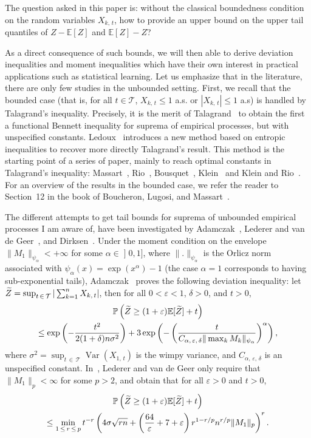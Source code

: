 \documentclass[10pt]{amsart}
\theoremstyle{definition}\newtheorem{defi}[theo]{Definition}\newtheorem{rema}[theo]{Remark}\newtheorem{exam}[theo]{Example}\newtheorem{exem}[theo]{Example}\newtheorem{nota}[theo]{Notation}
\DeclareMathOperator{\Var}{Var}
\newcommand{\bE}{\mathbb{E}}
\newcommand{\bP}{\mathbb{P}}
\newcommand{\cT}{\mathcal{T}}
\newcommand{\intervalleof}[2]{\mathopen{]} #1\mathclose{}\mathpunct{},#2\mathclose{]}}
\let\oldtilde\tilde
\renewcommand*{\tilde}[1]{\mathchoice{\widetilde{#1}}{\widetilde{#1}}{\oldtilde{#1}}{\oldtilde{#1}}}
\begin{document}
The question asked in this paper is: without the classical boundedness condition on the random variables $X_{k,\,t}$, how to provide an upper bound on the upper tail quantiles of $Z-\bE[Z]$ and $\bE[Z]-Z$?

As a direct consequence of such bounds, we will then able to derive deviation inequalities and moment inequalities which have their own interest in practical applications such as statistical learning. Let us emphasize that in the literature, there are only few studies in the unbounded setting. First, we recall that the bounded case (that is, for all $t\in\cT$, $X_{k,\,t}\leq 1$ a.s. or $|X_{k,\,t}|\leq 1$ a.s) is handled by Talagrand's inequality. Precisely, it is the merit of Talagrand~\cite{Talagrand96a} to obtain the first a functional Bennett inequality for suprema of empirical processes, but with unspecified constants. Ledoux~\cite{Ledoux97} introduces a new method based on entropic inequalities to recover more directly Talagrand’s result. This method is the starting point of a series of paper, mainly to reach optimal constants in Talagrand's inequality: Massart~\cite{Massart00}, Rio~\cite{Rio01,Rio02,Rio12}, Bousquet~\cite{Bousquet03}, Klein~\cite{Klein02} and Klein and Rio~\cite{KR05}. For an overview of the results in the bounded case, we refer the reader to Section~12 in the book of Boucheron, Lugosi, and Massart~\cite{BLM13}.

The different attempts to get tail bounds for suprema of unbounded empirical processes I am aware of, have been investigated by Adamczak~\cite{Adamczak08}, Lederer and van de Geer~\cite{vdGL14,vdGL13}, and Dirksen~\cite{Dirksen15}. Under the moment condition on the envelope $\|M_1\|_{\psi_\alpha}<+\infty$ for some $\alpha\in\intervalleof 01$, where $\|.\|_{\psi_\alpha}$ is the Orlicz norm associated with $\psi_\alpha(x)=\exp(x^{\alpha})-1$ (the case $\alpha=1$ corresponds to having sub-exponential tails), Adamczak~\cite[Theorem~4]{Adamczak08} proves the following deviation inequality: let $\tilde Z=\sup_{t\,\in\,\cT}|\sum_{k=1}^nX_{k,\,t}|$, then for all $0<\varepsilon<1$, $\delta>0$, and $t>0$,
\begin{multline}
\bP\left(\tilde Z\geq (1+\varepsilon)\bE[\tilde Z]+t\right)\\
\leq \exp\left(-\frac{t^2}{2(1+\delta)n\sigma^2}\right)+3\exp\left(-\left(\frac{t}{C_{\alpha,\,\varepsilon,\,\delta}\|\max_k M_k\|_{\psi_\alpha}}\right)^\alpha\right),
\end{multline}
where $\sigma^2=\sup_{t\,\in\,\cT}\Var(X_{1,\,t})$ is the wimpy variance, and $C_{\alpha,\,\varepsilon,\,\delta}$ is an unspecified constant. In~\cite[Corollary~3.1]{vdGL14}, Lederer and van de Geer only require that $\|M_1\|_p<\infty$ for some $p>2$, and obtain that for all $\varepsilon>0$ and $t>0$,
\begin{multline}
\bP\left(\tilde Z\geq (1+\varepsilon)\bE[\tilde Z]+ t\right) \\
\leq \min_{1\,\leq\,r\,\leq\,p} t^{-r}\left(4\sigma\sqrt{rn}+\left(\frac{64}{\varepsilon}+7+\varepsilon\right)r^{1-r/p}n^{r/p}\|M_1\|_p\right)^r.
\end{multline}
\end{document}
